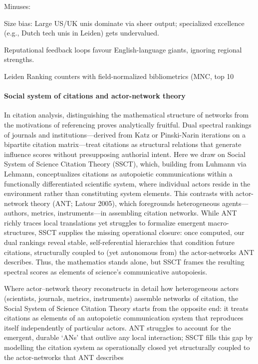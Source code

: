 \documentclass[10pt]{article}
\begin{document}
Minuses:

Size bias: Large US/UK unis dominate via sheer output; specialized excellence (e.g., Dutch tech unis in Leiden) gets undervalued.

Reputational feedback loops favour English-language giants, ignoring regional strengths.



Leiden Ranking counters with field-normalized bibliometrics (MNC, top 10%


\paragraph{Social system of citations and actor-network theory}
In citation analysis, distinguishing the mathematical structure of networks from the motivations of referencing proves analytically fruitful. Dual spectral rankings of journals and institutions—derived from Katz or Pinski-Narin iterations on a bipartite citation matrix—treat citations as structural relations that generate influence scores without presupposing authorial intent. Here we draw on Social System of Science Citation Theory (SSCT), which, building from Luhmann via Lehmann, conceptualizes citations as autopoietic communications within a functionally differentiated scientific system, where individual actors reside in the environment rather than constituting system elements. This contrasts with actor-network theory (ANT; Latour 2005), which foregrounds heterogeneous agents—authors, metrics, instruments—in assembling citation networks. While ANT richly traces local translations yet struggles to formalize emergent macro-structures, SSCT supplies the missing operational closure: once computed, our dual rankings reveal stable, self-referential hierarchies that condition future citations, structurally coupled to (yet autonomous from) the actor-networks ANT describes. Thus, the mathematics stands alone, but SSCT frames the resulting spectral scores as elements of science's communicative autopoiesis.

Where actor–network theory reconstructs in detail how heterogeneous actors (scientists, journals, metrics, instruments) assemble networks of citation, the Social System of Science Citation Theory starts from the opposite end: it treats citations as elements of an autopoietic communication system that reproduces itself independently of particular actors. ANT struggles to account for the emergent, durable ‘ANs’ that outlive any local interaction; SSCT fills this gap by modelling the citation system as operationally closed yet structurally coupled to the actor-networks that ANT describes
\end{document}
